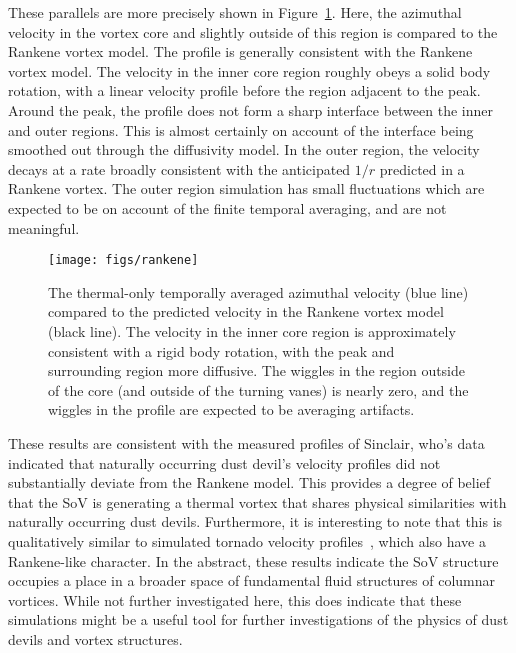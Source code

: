 These parallels are more precisely shown in
Figure~\ref{fig:rankene}. Here, the azimuthal velocity in the vortex
core and slightly outside of this region is compared to the Rankene
vortex model. The profile is generally consistent with the Rankene
vortex model. The velocity in the inner core region roughly obeys a
solid body rotation, with a linear velocity profile before the region
adjacent to the peak. Around the peak, the profile does not form a sharp
interface between the inner and outer regions. This is almost certainly
on account of the interface being smoothed out through the diffusivity
model. In the outer region, the velocity decays at a rate broadly
consistent with the anticipated $1/r$ predicted in a Rankene vortex. 
The outer region simulation has small fluctuations which are expected to
be on account of the finite temporal averaging, and are not meaningful. 

\begin{figure}[htb]
\centering
 \texttt{[image: figs/rankene]}
 \caption{The thermal-only temporally averaged azimuthal velocity (blue
 line) compared to the predicted 
 velocity in the Rankene vortex model (black line). The velocity in the
 inner core region is approximately consistent with a rigid body
 rotation, with the peak and surrounding region more diffusive. The
 wiggles in the region outside of the core (and outside of the turning
 vanes) is nearly zero, and the wiggles in the profile are expected to
 be averaging artifacts.} 
 \label{fig:rankene}  
\end{figure}

These results are consistent with the measured profiles of Sinclair,
who's data indicated that naturally occurring dust devil's velocity
profiles did not substantially deviate from the Rankene model. 
This provides a degree of belief that the SoV is generating a
thermal vortex that shares physical similarities with naturally
occurring dust devils. Furthermore, it is interesting to note that this
is qualitatively similar to simulated tornado velocity
profiles~\cite{nolan1999structure}, which also have a Rankene-like
character. In the abstract, these results indicate 
the SoV structure occupies a place in a broader space of fundamental 
fluid structures of columnar vortices. While not further investigated
here, this does indicate that these simulations might be a useful tool
for further investigations of the physics of dust devils and vortex
structures. 




